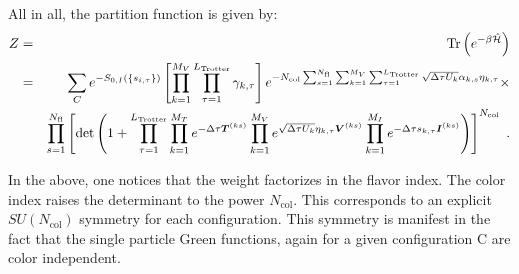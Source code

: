 All in all,   the partition function is given by:
\begin{eqnarray}
    Z &=& \mathop{\mathrm{Tr}}{  \left( e^{-\beta \hat{\mathcal{H}} }\right) }\nonumber\\
    &=&   \sum_{C}   e^{-S_{0,I} \left( \left\{ s_{i,\tau} \right\}  \right) }     \left[ \prod_{k=1}^{M_V} \prod_{\tau=1}^{L_{\mathrm{Trotter}}} \gamma_{k,\tau} \right] 
    e^{- N_{\mathrm{col}}\sum_{s=1}^{N_{\mathrm{fl}}} \sum_{k=1}^{M_V} \sum_{\tau = 1}^{L_{\mathrm{Trotter}}}\sqrt{\Delta \tau U_k}  \alpha_{k,s} \eta_{k,\tau} } 
  \times   \nonumber \\
  &\quad&
      \prod_{s=1}^{N_{\mathrm{fl}}}\left[\det\left(  1 + 
     \prod_{\tau=1}^{L_{\mathrm{Trotter}}}   \prod_{k=1}^{M_T}   e^{-\Delta \tau {\bm T}^{(ks)}}  
    \prod_{k=1}^{M_V}   e^{  \sqrt{ \Delta \tau  U_k} \eta_{k,\tau} {\bm V}^{(ks)} }   \prod_{k=1}^{M_I}   e^{  -\Delta \tau s_{k,\tau}  {\bm I}^{(ks)}}  
     \right) \right]^{N_{\mathrm{col}}} \;.
\end{eqnarray}

In the above, one notices that the weight factorizes in  the flavor index. The color index raises the determinant to the power $N_{\mathrm{col}}$. This corresponds to  an explicit $SU(N_{\mathrm{col}})$ symmetry   for each  configuration. This symmetry is manifest in the fact that the single particle  Green functions, again for a given  configuration C are color independent. 


 

